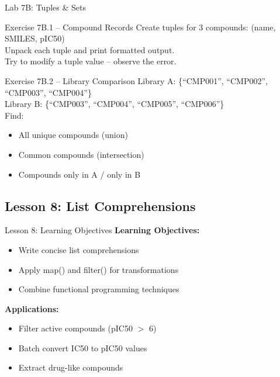 \documentclass{beamer}
\begin{document}
\begin{frame}{\textcolor{labcolor}{Lab 7B: Tuples \& Sets}}
    \footnotesize
    \begin{block}{Exercise 7B.1 -- Compound Records}
        Create tuples for 3 compounds: (name, SMILES, pIC50)\\
        Unpack each tuple and print formatted output.\\
        Try to modify a tuple value -- observe the error.
    \end{block}
    \vspace{0.2em}
    \begin{block}{Exercise 7B.2 -- Library Comparison}
        Library A: \{``CMP001'', ``CMP002'', ``CMP003'', ``CMP004''\}\\
        Library B: \{``CMP003'', ``CMP004'', ``CMP005'', ``CMP006''\}\\
        Find:
        \begin{itemize}\setlength{\itemsep}{0pt}
            \item All unique compounds (union)
            \item Common compounds (intersection)
            \item Compounds only in A / only in B
        \end{itemize}
    \end{block}
\end{frame}

\subsection{Lesson 8: List Comprehensions}

\begin{frame}{Lesson 8: Learning Objectives}
    \small
    \textbf{Learning Objectives:}
    \begin{itemize}
        \item Write concise list comprehensions
        \item Apply map() and filter() for transformations
        \item Combine functional programming techniques
    \end{itemize}
    \vspace{0.5em}
    \textbf{Applications:}
    \begin{itemize}
        \item Filter active compounds (pIC50 $>$ 6)
        \item Batch convert IC50 to pIC50 values
        \item Extract drug-like compounds
    \end{itemize}
\end{frame}
\end{document}
